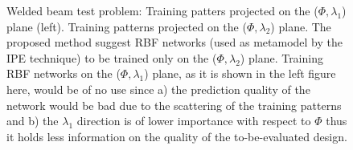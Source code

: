 \begin{figure}[h!]
\begin{minipage}[b]{0.5\linewidth}
 \centering
\end{minipage}
\begin{minipage}[b]{0.5\linewidth}
 \centering
\end{minipage}
\caption{Welded beam test problem: Training patters projected on the ($\Phi,\lambda_1$) plane (left).  Training patterns projected on the ($\Phi,\lambda_2$) plane. The proposed method suggest RBF networks (used as metamodel by the IPE technique) to be trained only on the ($\Phi,\lambda_2$) plane. Training RBF networks on the ($\Phi,\lambda_1$) plane, as it is shown in the left figure here, would be of no use since a) the prediction quality of the network would be bad due to the scattering of the training patterns and b) the $\lambda_1$ direction is of lower importance with respect to $\Phi$ thus it holds less information on the quality of the to-be-evaluated design.} 
\label{1dann}
\end{figure}

